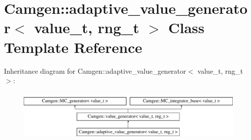 \hypertarget{a00001}{}\section{Camgen\+:\+:adaptive\+\_\+value\+\_\+generator$<$ value\+\_\+t, rng\+\_\+t $>$ Class Template Reference}
\label{a00001}
Inheritance diagram for Camgen\+:\+:adaptive\+\_\+value\+\_\+generator$<$ value\+\_\+t, rng\+\_\+t $>$\+:\begin{figure}[H]
\begin{center}
\leavevmode
\includegraphics[height=2.600619cm]{a00001}
\end{center}
\end{figure}
